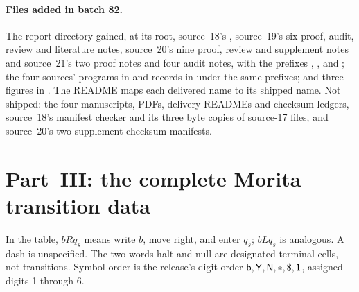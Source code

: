 \documentclass[11pt,letterpaper]{article}
\numberwithin{equation}{section}
\theoremstyle{definition}
\theoremstyle{remark}
\newcommand{\lab}[1]{\mathsf{#1}}\newcommand{\diag}{\operatorname{diag}}
\begin{document}
\paragraph{Files added in batch 82.} The report directory gained, at its root, source~18's , source~19's six proof, audit, review and literature notes, source~20's nine proof, review and supplement notes and source~21's two proof notes and four audit notes, with the prefixes , ,  and ; the four sources' programs in  and records in  under the same prefixes; and three figures in . The README maps each delivered name to its shipped name. Not shipped: the four manuscripts, PDFs, delivery READMEs and checksum ledgers, source~18's manifest checker and its three byte copies of source-17 files, and source~20's two supplement checksum manifests.


\section{Part~III: the complete Morita transition data}\label{smc:cs:app:tm}
In the table, $bRq_s$ means write $b$, move right, and enter $q_s$; $bLq_s$ is analogous. A dash is unspecified. The two words halt and null are designated terminal cells, not transitions. Symbol order is the release's digit order $\blank,\lab Y,\lab N,\lab *,\lab\$,\lab1$, assigned digits 1 through 6.
\end{document}
